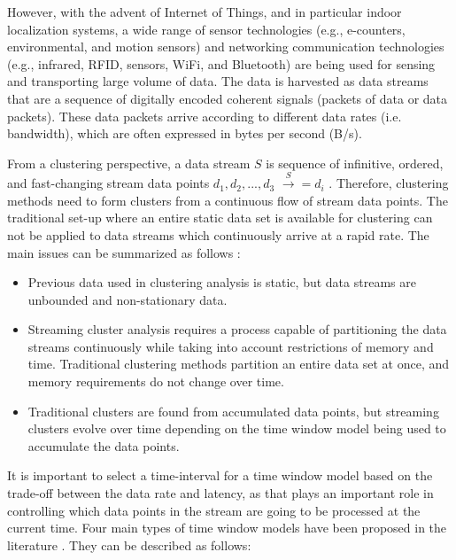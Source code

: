 However, with the advent of Internet of Things, and in particular indoor localization systems, a wide range of sensor technologies (e.g., e-counters, environmental, and motion sensors) and networking communication technologies (e.g., infrared, RFID, sensors, WiFi, and Bluetooth) are being used for sensing and transporting large volume of data. The data is harvested as data streams that are a sequence of digitally encoded coherent signals (packets of data or data packets). These data packets arrive according to different data rates (i.e. bandwidth), which are often expressed in bytes per second (B/s).

From a clustering perspective, a data stream $S$ is sequence of infinitive, ordered, and fast-changing stream data points $d_1, d_2, ..., d_3 $ $\xrightarrow S = {d_i}$ \cite{han2011data}. Therefore, clustering methods need to form clusters from a continuous flow of stream data points. The traditional set-up where an entire static data set is available for clustering can not be applied to data streams which continuously arrive at a rapid rate. The main issues can be summarized as follows \cite{toshniwal2013clustering}:

\begin{itemize}
    \item Previous data used in clustering analysis is static, but data streams are unbounded and non-stationary data.
    \item Streaming cluster analysis requires a process capable of partitioning the data streams continuously while taking into account restrictions of memory and time. Traditional clustering methods partition an entire data set at once, and memory requirements do not change over time. 
    \item Traditional clusters are found from accumulated data points, but streaming clusters evolve over time depending on the time window model being used to accumulate the data points.
\end{itemize}

It is important to select a time-interval for a time window model based on the trade-off between the data rate and latency, as that plays an important role in controlling which data points in the stream are going to be processed at the current time. Four main types of time window models have been proposed in the literature \cite{nguyen2015survey, mansalis2018evaluation}. They can be described as follows:


